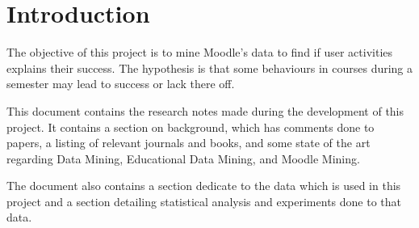 \chapter{Introduction}

The objective of this project is to mine Moodle's data to find if user
activities explains their success. The hypothesis is that some behaviours in
courses during a semester may lead to success or lack there off.

This document contains the research notes made during the development of this
project. It contains a section on background, which has comments done to
papers, a listing of relevant journals and books, and some state of the art
regarding Data Mining, Educational Data Mining, and Moodle Mining.

The document also contains a section dedicate to the data which is used in this
project and a section detailing statistical analysis and experiments done to
that data.
